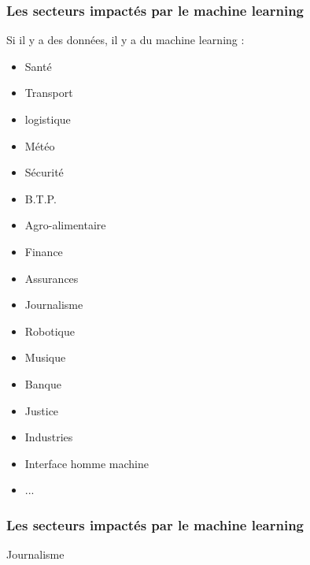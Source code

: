 \begin{frame}
  \frametitle{Les secteurs impactés par le machine learning}
  Si il y a des données, il y a du machine learning :
  \newline
  \newline
  \begin{minipage}[c]{0.49\linewidth}
    \begin{itemize}
    \item Santé 
    \item Transport
    \item logistique
    \item Météo
    \item Sécurité
    \item B.T.P.
    \item Agro-alimentaire    
    \item Finance
    \item Assurances
    \end{itemize}
  \end{minipage}\hfill
  \begin{minipage}[c]{0.49\linewidth}
    \begin{itemize}
    \item Journalisme
    \item Robotique
    \item Musique
    \item Banque
    \item Justice
    \item Industries
    \item Interface homme machine
    \item ...
    \end{itemize}
  \end{minipage}\hfill
\end{frame}

\begin{frame}
  \frametitle{Les secteurs impactés par le machine learning}
  Journalisme
\end{frame}
